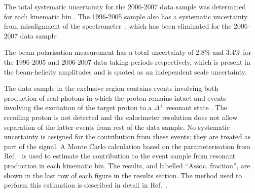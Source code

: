 The total systematic uncertainty for the 2006-2007 data sample was
determined for each kinematic bin .  The 1996-2005 sample also has a
systematic uncertainty from misalignment of the
spectrometer~\cite{Air09}, which has been eliminated for the 2006-2007 data sample 

The beam polarisation measurement has a total uncertainty of 2.8\% and 3.4\% for the 1996-2005 and 2006-2007 data taking periods respectively,
which is present in the beam-helicity amplitudes and is quoted as an
independent scale uncertainty. 

The data sample in the exclusive region contains events involving both
production of real photons in which the proton remains intact and
events involving the excitation of the target proton to a $\Delta^+$
resonant state . The recoiling proton is not detected and
  the calorimeter resolution does not allow separation of the latter events from rest of the data sample.
No systematic uncertainty is assigned for the contribution from these
events; they are treated as part of the signal. A Monte Carlo
calculation based on the parameterisation from Ref.~\cite{Bra76} is
used to estimate the contribution to the event sample from resonant
production in each kinematic bin. The results,  and labelled ``Assoc. fraction'', are shown in the last row of each figure in the results section. The method used to perform this estimation is described in detail in
Ref.~\cite{Air08}.

